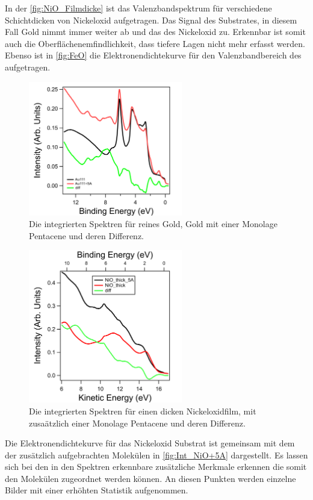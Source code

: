        In der \autoref{fig:NiO_Filmdicke} ist das Valenzbandspektrum für verschiedene Schichtdicken von Nickeloxid aufgetragen. 
        Das Signal des Substrates, in diesem Fall Gold nimmt immer weiter ab und das des Nickeloxid zu. 
        Erkennbar ist somit auch die Oberflächenemfindlichkeit, dass tiefere Lagen nicht mehr erfasst werden.
        Ebenso ist in \autoref{fig:FeO} die Elektronendichtekurve für den Valenzbandbereich des  aufgetragen.
        \begin{figure}
            \centering
            \includegraphics[width=0.6\textwidth]{./content/pictures/Au+5A/EDC_Au_5A.png}
            \caption{Die integrierten Spektren für reines Gold, Gold mit einer Monolage Pentacene und deren Differenz.}
            \label{fig:Au+5A}
        \end{figure}
        \begin{figure}
            \centering
            \includegraphics[width=0.6\textwidth]{./content/pictures/NiO+5A/NiO_thick_5A.png}
            \caption{Die integrierten Spektren für einen dicken Nickeloxidfilm, mit zusaätzlich einer Monolage Pentacene und deren Differenz.}
            \label{fig:Int_NiO+5A}
        \end{figure}
        Die Elektronendichtekurve für das Nickeloxid Substrat ist gemeinsam mit dem der zusätzlich aufgebrachten Molekülen in \autoref{fig:Int_NiO+5A} dargestellt.
        Es lassen sich bei den in den Spektren erkennbare zusätzliche Merkmale erkennen die somit den Molekülen zugeordnet werden können.
        An diesen Punkten werden einzelne Bilder mit einer erhöhten Statistik aufgenommen.

